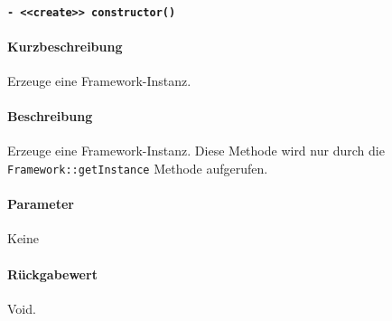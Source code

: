 \paragraph{\texttt{- <<create>> constructor()}}%
\paragraph*{Kurzbeschreibung}
Erzeuge eine Framework-Instanz.
\paragraph*{Beschreibung}
Erzeuge eine Framework-Instanz.
Diese Methode wird nur durch die \verb#Framework::getInstance# Methode aufgerufen.
\paragraph*{Parameter}
Keine
\paragraph*{Rückgabewert}
Void.